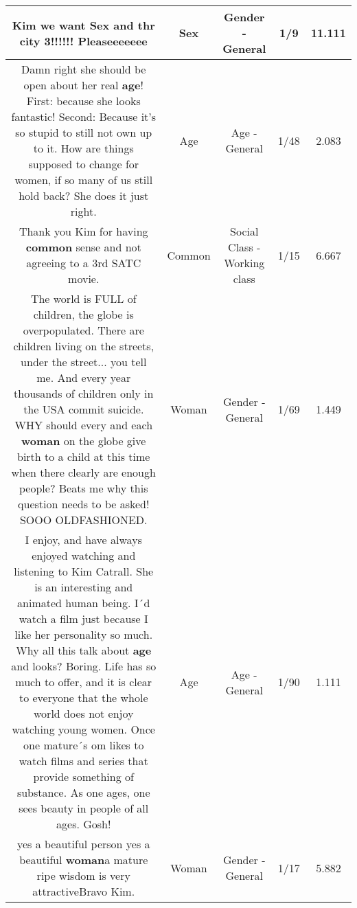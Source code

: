 \documentclass[11pt]{article}
\newlength\mylength
\begin{document}
\begin{center}
\begin{longtable}{|C{.65\mylength}|C{.30\mylength}|C{.12\mylength}|C{.12\mylength}|C{.12\mylength}|}
  \small Kim we want \textbf{Sex} and thr city 3!!!!!! Pleaseeeeeee\normalsize   & Sex & Gender - General & 1/9 & 11.111 \\  \hline
  \small Damn right she should be open about her real \textbf{age}! First: because she looks fantastic! Second: Because it's so stupid to still not own up to it. How are things supposed to change for women, if so many of us still hold back? She does it just right.\normalsize   & Age & Age - General & 1/48 & 2.083 \\  \hline
  \small Thank you Kim for having \textbf{common} sense and not agreeing to a 3rd SATC movie.\normalsize   & Common & Social Class - Working class & 1/15 & 6.667 \\  \hline
  \small The world is FULL of children, the globe is overpopulated. There are children living  on the streets, under the street... you tell me. And every year thousands of children only in the USA  commit suicide. WHY should every and each \textbf{woman} on the globe give birth to a child at this time when there clearly are enough people? Beats me why this question needs to be asked! SOOO OLDFASHIONED.\normalsize   & Woman & Gender - General & 1/69 & 1.449 \\  \hline
  \small I enjoy, and have always enjoyed watching and listening to Kim Catrall. She is an interesting and animated human being. I´d watch a film just because I like her personality so much. Why all this talk about \textbf{age} and looks? Boring. Life has so much to offer, and it is clear to everyone that the whole world does not enjoy watching young women. Once one mature´s om likes to watch films and series that provide something of substance. As one ages, one sees beauty in  people of all ages. Gosh!\normalsize   & Age & Age - General & 1/90 & 1.111 \\  \hline
  \small yes a beautiful person yes  a beautiful  \textbf{woman}a  mature  ripe  wisdom is very attractiveBravo  Kim.\normalsize   & Woman & Gender - General & 1/17 & 5.882 \\  \hline

\end{longtable}
\end{center}
\end{document}
